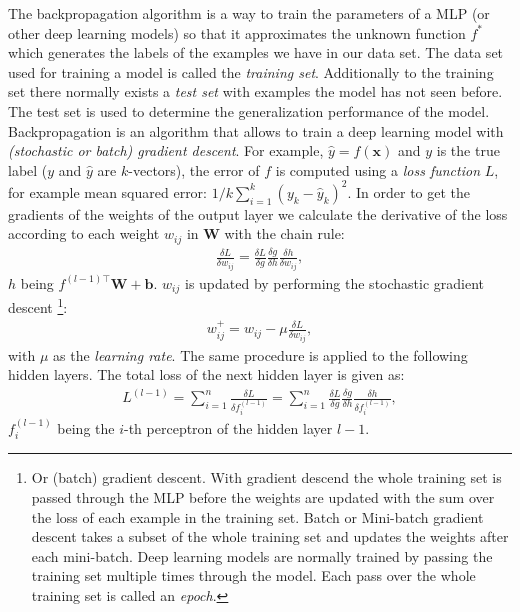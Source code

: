 \documentclass[]{article}
\begin{document}
The backpropagation algorithm is a way to train the parameters of a
MLP (or other deep learning models) so that it approximates the
unknown function $f^*$ which generates the labels of the examples
we have in our data set.
The data set used for training a model is called the \textit{training
set}. Additionally to the training set there normally exists a
\textit{test set} with examples the model has not seen before.
The test set is used to determine the generalization performance of
the model.
Backpropagation is an algorithm that allows to train a deep learning
model with \textit{(stochastic or batch) gradient descent}.
For example, $\hat{y} = f(\mathbf{x})$ and $y$ is the true label
($y$ and $\hat{y}$ are $k$-vectors), the error of $f$ is computed
using a \textit{loss function} $L$, for example mean squared error:
$1/k \sum_{i=1}^{k}(y_k - \hat{y}_k)^2$.
In order to get the gradients of the weights of the output layer
we calculate the derivative of the loss according to each weight
$w_{ij}$ in $\mathbf{W}$ with the chain rule:
\begin{align}
  \frac{\delta L}{\delta w_{ij}} =
    \frac{\delta L}{\delta g}
    \frac{\delta g}{\delta h}
    \frac{\delta h}{\delta w_{ij}},
\end{align}
$h$ being $f^{(l-1)\top}\mathbf{W} + \mathbf{b}$.
$w_{ij}$ is updated by performing the stochastic gradient descent%
\footnote{Or (batch) gradient descent. With gradient descend the whole
  training set is passed through the MLP before the weights
  are updated with the sum over the loss of each example in the
  training set. Batch or Mini-batch gradient descent takes a subset of
  the whole training set and updates the weights after each
  mini-batch. Deep learning models are normally trained by passing the
  training set multiple times through the model. Each pass over the
  whole training set is called an \textit{epoch}.
}:
\begin{align}
  w_{ij}^+ = w_{ij} - \mu \frac{\delta L}{\delta w_{ij}},
\end{align}
with $\mu$ as the \textit{learning rate}.
The same procedure is applied to the following hidden layers.
The total loss of the next hidden layer is given as:
\begin{align}
  L^{(l-1)} = \sum_{i=1}^n\frac{\delta L}{\delta f^{(l - 1)}_i} =
  \sum_{i=1}^n\frac{\delta L}{\delta g}
    \frac{\delta g}{\delta h}
    \frac{\delta h}{\delta f^{(l - 1)}_i},
\end{align}
$f^{(l-1)}_i$ being the $i$-th perceptron of the hidden layer $l-1$.
\end{document}
